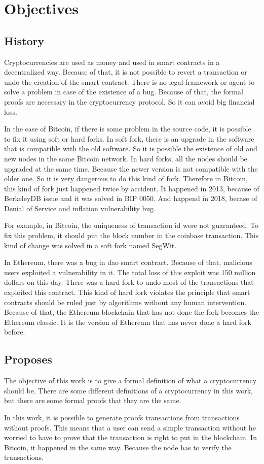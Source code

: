 \section{Objectives}

\subsection{History}

Cryptocurrencies are used as money and used in smart contracts in a decentralized way.
Because of that, it is not possible to revert a transaction or undo the creation of the smart contract.
There is no legal framework or agent to solve a problem in case of the existence of a bug.
Because of that, the formal proofs are necessary in the cryptocurrency protocol.
So it can avoid big financial loss.

In the case of Bitcoin, if there is some problem in the source code,
it is possible to fix it using soft or hard forks.
In soft fork, there is an upgrade in the software that is compatible with the old software.
So it is possible the existence of old and new nodes in the same Bitcoin network.
In hard forks, all the nodes should be upgraded at the same time.
Because the newer version is not compatible with the older one.
So it is very dangerous to do this kind of fork.
Therefore in Bitcoin, this kind of fork just happened twice by accident.
It happened in 2013, because of BerkeleyDB issue and it was solved in BIP 0050.
And happend in 2018, becase of Denial of Service and inflation vulnerability bug.

For example, in Bitcoin, the uniqueness of transaction \gls{id} were not guaranteed.
To fix this problem, it should put the block number in the coinbase transaction.
This kind of change was solved in a soft fork named SegWit.

In Ethereum, there was a bug in \gls{dao} smart contract.
Because of that, malicious users exploited a vulnerability in it.
The total loss of this exploit was 150 million dollars on this day.
There was a hard fork to undo most of the transactions that exploited this contract.
This kind of hard fork violates the principle that smart contracts should be ruled just by
algorithms without any human intervention.
Because of that, the Ethereum blockchain that has not done the fork becomes the Ethereum classic.
It is the version of Ethereum that has never done a hard fork before.

\subsection{Proposes}

The objective of this work is to give a formal definition of what a cryptocurrency should be.
There are some different definitions of a cryptocurrency in this work,
but there are some formal proofs that they are the same.

In this work, it is possible to generate proofs transactions from transactions without proofs.
This means that a user can send a simple transaction without he worried to have to prove that
the transaction is right to put in the blockchain.
In Bitcoin, it happened in the same way.
Because the node has to verify the transactions.
